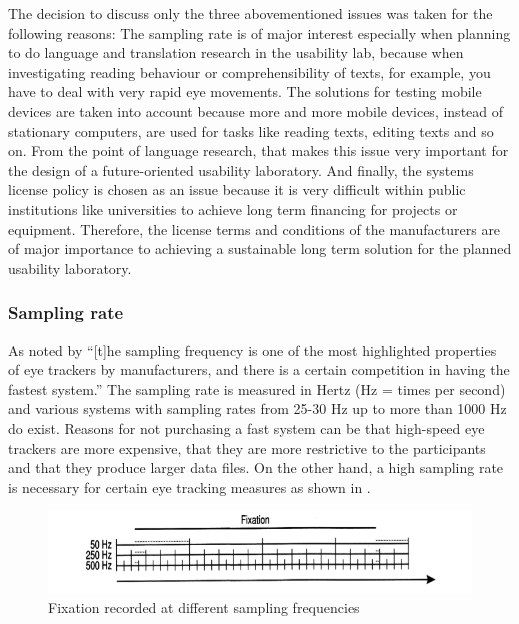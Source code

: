 \documentclass[output=paper]{langsci/langscibook}
\begin{document}
The decision to discuss only the three abovementioned issues was taken for the following reasons: The sampling rate is of major interest especially when planning to do language and translation research in the usability lab, because when investigating reading behaviour or comprehensibility of texts, for example, you have to deal with very rapid eye movements. The solutions for testing mobile devices are taken into account because more and more mobile devices, instead of stationary computers, are used for tasks like reading texts, editing texts and so on. From the point of language research, that makes this issue very important for the design of a future-oriented usability laboratory. And finally, the systems license policy is chosen as an issue because it is very difficult within public institutions like universities to achieve long term financing for projects or equipment. Therefore, the license terms and conditions of the manufacturers are of major importance to achieving a sustainable long term solution for the planned usability laboratory.


\subsubsection{Sampling rate}

As noted by \citet[29]{Holmqvist2011} ``[t]he sampling frequency is one of the most highlighted properties of eye trackers by manufacturers, and there is a certain competition in having the fastest system.'' The sampling rate is measured in Hertz (Hz = times per second) and various systems with sampling rates from 25-30 Hz up to more than 1000 Hz do exist. Reasons for not purchasing a fast system can be that high-speed eye trackers are more expensive, that they are more restrictive to the participants and that they produce larger data files. On the other hand, a high sampling rate is necessary for certain eye tracking measures as shown in .

\begin{figure}
 \includegraphics[width=\textwidth]{figures/Roesener4.png}
 \caption{Fixation recorded at different sampling frequencies \citep[31]{Holmqvist2011}}
 \label{roesener:fig:4}
\end{figure} 
\end{document}
